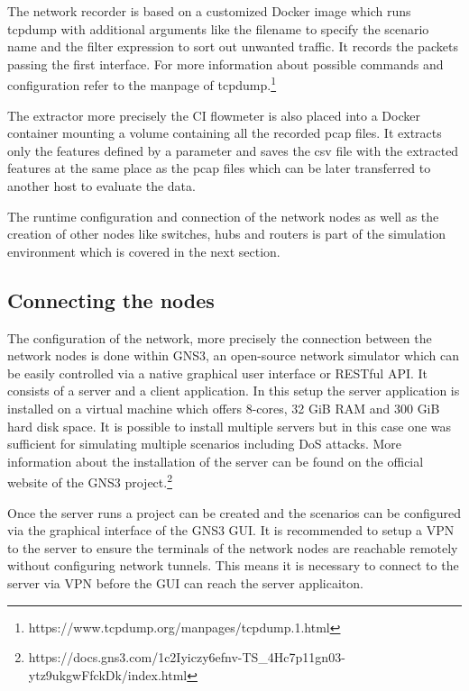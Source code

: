 \documentclass[conference]{IEEEtran}
\begin{document}
The network recorder is based on a customized Docker image which runs tcpdump with additional arguments like the filename to specify the scenario name and the filter expression to sort out unwanted traffic. It records the packets passing the first interface. For more information about possible commands and configuration refer to the manpage of tcpdump.\footnote{https://www.tcpdump.org/manpages/tcpdump.1.html}

The extractor more precisely the CI flowmeter is also placed into a Docker container mounting a volume containing all the recorded pcap files. It extracts only the features defined by a parameter and saves the csv file with the extracted features at the same place as the pcap files which can be later transferred to another host to evaluate the data.

The runtime configuration and connection of the network nodes as well as the creation of other nodes like switches, hubs and routers is part of the simulation environment which is covered in the next section.

\subsection{Connecting the nodes}

The configuration of the network, more precisely the connection between the network nodes is done within GNS3, an open-source network simulator which can be easily controlled via a native graphical user interface or RESTful API. It consists of a server and a client application. In this setup the server application is installed on a virtual machine which offers 8-cores, 32 GiB RAM and 300 GiB hard disk space. It is possible to install multiple servers but in this case one was sufficient for simulating multiple scenarios including DoS attacks. More information about the installation of the server can be found on the official website of the GNS3 project.\footnote{https://docs.gns3.com/1c2Iyiczy6efnv-TS\_4Hc7p11gn03-ytz9ukgwFfckDk/index.html} 

Once the server runs a project can be created and the scenarios can be configured via the graphical interface of the GNS3 GUI. It is recommended to setup a VPN to the server to ensure the terminals of the network nodes are reachable remotely without configuring network tunnels. This means it is necessary to connect to the server via VPN before the GUI can reach the server applicaiton.
\end{document}
